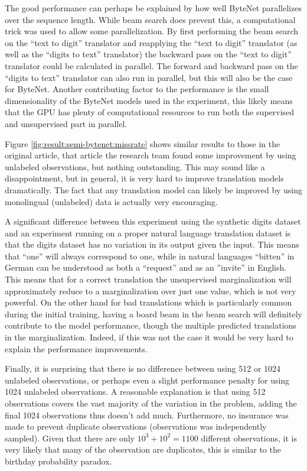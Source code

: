 The good performance can perhaps be explained by how well ByteNet parallelizes over the sequence length. While beam search does prevent this, a computational trick was used to allow some parallelization. By first performing the beam search on the ``text to digit'' translator and reapplying the ``text to digit'' translator (as well as the ``digits to text'' translator) the backward pass on the ``text to digit'' translator could be calculated in parallel. The forward and backward pass on the ``digits to text'' translator can also run in parallel, but this will also be the case for ByteNet. Another contributing factor to the performance is the small dimensionality of the ByteNet models used in the experiment, this likely means that the GPU has plenty of computational resources to run both the supervised and unsupervised part in parallel.

Figure \ref{fig:result:semi-bytenet:missrate} shows similar results to those in the original article, that article the research team found some improvement by using unlabeled observations, but nothing outstanding. This may sound like a disappointment, but in general, it is very hard to improve translation models dramatically. The fact that any translation model can likely be improved by using monolingual (unlabeled) data is actually very encouraging.

A significant difference between this experiment using the synthetic digits dataset and an experiment running on a proper natural language translation dataset is that the digits dataset has no variation in its output given the input. This means that ``one'' will always correspond to one, while in natural languages ``bitten'' in German can be understood as both a ``request'' and as an ''invite'' in English. This means that for a correct translation the unsupervised marginalization will approximately reduce to a marginalization over just one value, which is not very powerful. On the other hand for bad translations which is particularly common during the initial training, having a board beam in the beam search will definitely contribute to the model performance, though the multiple predicted translations in the marginalization. Indeed, if this was not the case it would be very hard to explain the performance improvements. 


Finally, it is surprising that there is no difference between using 512 or 1024 unlabeled observations, or perhaps even a slight performance penalty for using 1024 unlabeled observations. A reasonable explanation is that using 512 observations covers the vast majority of the variation in the problem, adding the final 1024 observations thus doesn't add much. Furthermore, no insurance was made to prevent duplicate observations (observations was independently sampled). Given that there are only $10^3 + 10^2 = 1100$ different observations, it is very likely that many of the observation are duplicates, this is similar to the birthday probability paradox.